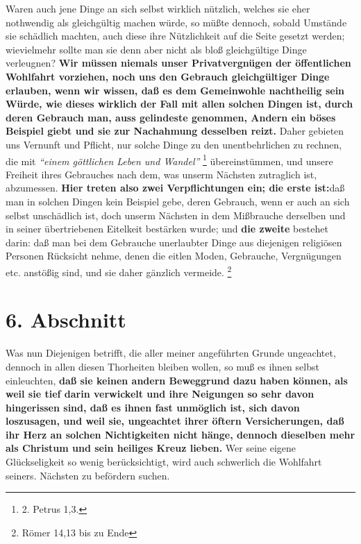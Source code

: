 Waren auch jene Dinge an sich selbst wirklich nützlich, welches sie eher
nothwendig als gleichgültig machen würde, so müßte dennoch, sobald Umstände sie
schädlich machten, auch diese ihre Nützlichkeit auf die Seite gesetzt werden;
wievielmehr sollte man sie denn aber nicht als bloß gleichgültige Dinge
verleugnen? \textbf{Wir müssen niemals unser Privatvergnügen der öffentlichen
Wohlfahrt
vorziehen, noch uns den Gebrauch gleichgültiger Dinge erlauben, wenn wir wissen,
daß es dem Gemeinwohle nachtheilig sein Würde, wie dieses wirklich der Fall mit
allen solchen Dingen ist, durch deren Gebrauch man, auss gelindeste genommen,
Andern ein böses Beispiel giebt und sie zur Nachahmung desselben reizt.} Daher
gebieten uns Vernunft und Pflicht, nur solche Dinge zu den unentbehrlichen zu
rechnen, die mit
\textit{"`einem göttlichen Leben und Wandel"'}
\footnote{2. Petrus 1,3.}
übereinstümmen, und unsere Freiheit ihres Gebrauches nach dem, was unserm
Nächsten zutraglich ist, abzumessen. \textbf{Hier treten also zwei
Verpflichtungen ein;
die erste ist:}daß man in solchen Dingen kein Beispiel gebe, deren Gebrauch,
wenn er auch an sich selbst unschädlich ist, doch unserm Nächsten in dem
Mißbrauche derselben und in seiner übertriebenen Eitelkeit bestärken wurde; und
\textbf{die zweite} bestehet darin: daß man bei dem Gebrauche unerlaubter Dinge
aus
diejenigen religiösen Personen Rücksicht nehme, denen die eitlen Moden,
Gebrauche, Vergnügungen etc. anstößig sind, und sie daher gänzlich
vermeide.
\footnote{Römer 14,13 bis zu Ende}

\section{6. Abschnitt} \label{kap18_ab6}

Was nun Diejenigen betrifft, die aller meiner angeführten Grunde ungeachtet,
dennoch in allen diesen Thorheiten bleiben wollen, so muß es ihnen selbst
einleuchten, \textbf{daß sie keinen andern Beweggrund dazu haben können, als
weil sie
tief darin verwickelt und ihre Neigungen so sehr davon hingerissen sind, daß es
ihnen fast unmöglich ist, sich davon loszusagen, und weil sie, ungeachtet ihrer
öftern Versicherungen, daß ihr Herz an solchen Nichtigkeiten nicht hänge,
dennoch dieselben mehr als Christum und sein heiliges Kreuz
lieben.} Wer seine
eigene Glückseligkeit so wenig berücksichtigt, wird auch schwerlich die
Wohlfahrt seiners. Nächsten zu befördern suchen.

